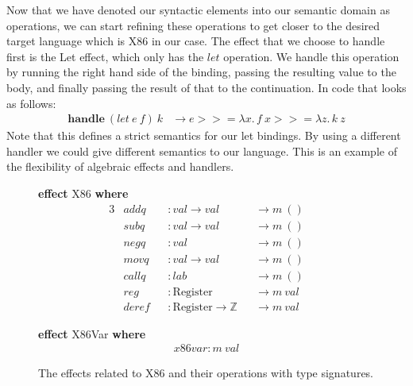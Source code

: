 \documentclass[a4paper,UKenglish,cleveref, autoref, thm-restate, anonymous]{oasics-v2021}
\newcommand\bind[1]{>\!\!>\!\!= \lambda #1.\,}
\begin{document}
Now that we have denoted our syntactic elements into our semantic domain as operations, we can start refining these operations to get closer to the desired target language which is X86 in our case.
The effect that we choose to handle first is the Let effect, which only has the $\mathit{let}$ operation.
We handle this operation by running the right hand side of the binding, passing the resulting value to the body, and finally passing the result of that to the continuation. In code that looks as follows:
\begin{align*}
  \mathbf{handle}~(\mathit{let}~e~f)~k & \to e \bind{x} f~x \bind{z} k~z
\end{align*}
Note that this defines a strict semantics for our let bindings.
By using a different handler we could give different semantics to our language.
This is an example of the flexibility of algebraic effects and handlers.

\begin{figure}[ht]
  \begin{minipage}[t]{0.4\textwidth}
  \textbf{effect} X86 \textbf{where}
  \vspace{-1em}
  \begin{alignat*}{3}
    & \mathit{addq}  && : \mathit{val} \to \mathit{val} && \to m~() \\
    & \mathit{subq}  && : \mathit{val} \to \mathit{val} && \to m~() \\
    & \mathit{negq}  && : \mathit{val}                  && \to m~() \\
    & \mathit{movq}  && : \mathit{val} \to \mathit{val} && \to m~() \\
    & \mathit{callq} && : \mathit{lab}                  && \to m~() \\
    & \mathit{reg}   && : \mathrm{Register}             && \to m~\mathit{val} \\
    & \mathit{deref} && : \mathrm{Register} \to \mathit{\mathbb{Z}} && \to m~\mathit{val}
  \end{alignat*}
  \end{minipage}
  \begin{minipage}[t]{0.4\textwidth}
  \textbf{effect} X86Var \textbf{where}
  \vspace{-1em}
  \begin{align*}
    \mathit{x86var} : m~\mathit{val}
  \end{align*}
  \end{minipage}
  \caption{The effects related to X86 and their operations with type signatures.}\label{fig:x86-ops}
\end{figure}
\end{document}
